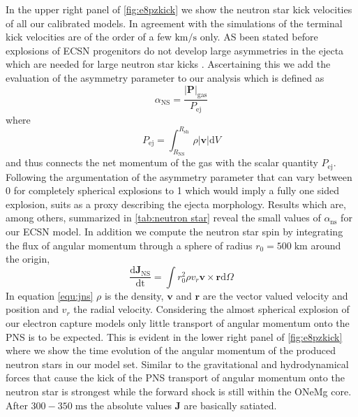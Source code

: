\documentclass[fleqn,usenatbib]{mnras}
\newcommand{\ud}{\ensuremath{\mathrm{d}}}
\begin{document}
In the upper right panel of \autoref{fig:e8pzkick} we show the neutron star kick velocities of all our calibrated models. In agreement with the simulations of \cite{Gessner2018} the terminal kick velocities are of the order of a few $\mathrm{km/s}$ only. AS been stated before explosions of ECSN progenitors do not develop large asymmetries in the ejecta which are needed for large neutron star kicks \cite{Scheck2006a}. Ascertaining this we add the evaluation of the asymmetry parameter to our analysis which is defined as 
\begin{equation}
    \alpha_{\mathrm{NS}} = \frac{|\mathbf{P}|_{\mathrm{gas}}}{P_{\mathrm{ej}}}
\end{equation}
where 
\begin{equation}
P_{\mathrm{ej}}=\int_{R_{\mathrm{NS}}}^{R_{\mathrm{sh}}}\rho |\mathbf{v}| \ud V
\end{equation}
and thus connects the net momentum of the gas with the scalar quantity $P_{\mathrm{ej}}$. Following the argumentation of \cite{Gessner2018} the asymmetry parameter that can vary between 0 for completely spherical explosions to 1 which would imply a fully one sided explosion, suits as a proxy describing the ejecta morphology. Results which are, among others, summarized in \autoref{tab:neutron star} reveal the small values of $\alpha_{\mathrm{ns}}$ for our ECSN model.
In addition we compute the neutron star spin by integrating the flux of angular momentum through a sphere of radius $r_{0}=500\;\mathrm{km}$ around the origin,
\begin{equation}
\label{equ:jns}
\frac{\mathrm{d}\mathbf{J}_{\mathrm{NS}}}{\mathrm{dt}} = \int r_0^2 \rho v_r \mathbf{v}\times \mathbf{r} \mathrm{d}\Omega
\end{equation}
In equation \ref{equ:jns} $\rho$ is the density, $\mathbf{v}$ and $\mathbf{r}$ are the vector valued velocity and position and $v_r$ the radial velocity. Considering the almost spherical explosion of our electron capture models only little transport of angular momentum onto the PNS is to be expected. This is evident in the lower right panel of \autoref{fig:e8pzkick} where we show the time evolution of the angular momentum of the produced neutron stars in our model set. Similar to the gravitational and hydrodynamical forces that cause the kick of the PNS transport of angular momentum onto the neutron star is strongest while the forward shock is still within the ONeMg core. After $300-350\;\mathrm{ms}$ the absolute values $\mathbf{J}$ are basically satiated.
\end{document}
